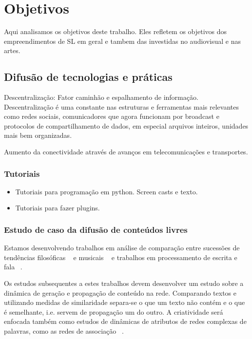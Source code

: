 \section{Objetivos}
\label{sec:objetivos}
Aqui analisamos os objetivos deste trabalho. Eles refletem os objetivos
dos empreendimentos de SL em geral e tambem das investidas no audiovisual e nas artes.

  \subsection{Difusão de tecnologias e práticas}
  \label{sec:tutoriais}
Descentralização: Fator caminhão e espalhamento de informação. Descentralização
é uma constante nas estruturas e ferramentas mais relevantes como redes
sociais, comunicadores que agora funcionam por broadcast e protocolos de
compartilhamento de dados, em especial arquivos inteiros, unidades mais
bem organizadas.

Aumento da conectividade através de avanços em telecomunicações e transportes.

    \subsubsection{Tutoriais}
    \label{sec:uso_sl}

\begin{itemize}
    \item Tutoriais para programação em python.
Screen casts e texto.

    \item Tutoriais para fazer plugins.
\end{itemize}

    \subsubsection{Estudo de caso da difusão de conteúdos livres}
    \label{sec:dif_sl}
Estamos desenvolvendo trabalhos em análise de comparação
entre sucessões de tendências filosóficas ~\cite{philome} e
musicais ~\cite{musime} e trabalhos em processamento de escrita
e fala ~\cite{rede-associacoes, complenet, enfmc, ifsc}.

Os estudos subsequentes a estes trabalhos devem desenvolver
um estudo sobre a dinâmica de geração e propagação de conteúdo na rede.
Comparando textos e utilizando medidas de similaridade separa-se
o que um texto não contém e o que é semelhante, i.e. servem de propagação
um do outro. A criatividade será enfocada também como estudos de dinâmicas
de atributos de redes complexas de palavras, como as redes de associação ~\cite{rede-associacoes}.


